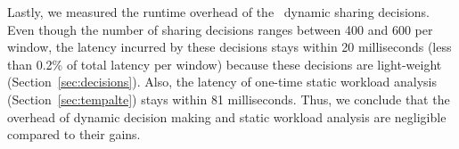 


Lastly, we measured the runtime overhead of the \app\ dynamic sharing decisions. Even though the number of sharing decisions ranges between 400 and 600 per window, the latency incurred by these decisions stays within 20 milliseconds (less than 0.2\% of total latency per window) because these decisions are light-weight (Section~\ref{sec:decisions}). Also, the latency of one-time static workload analysis (Section~\ref{sec:tempalte}) stays within 81 milliseconds. Thus, we conclude that the overhead of dynamic decision making and static workload analysis are negligible compared to their gains.









